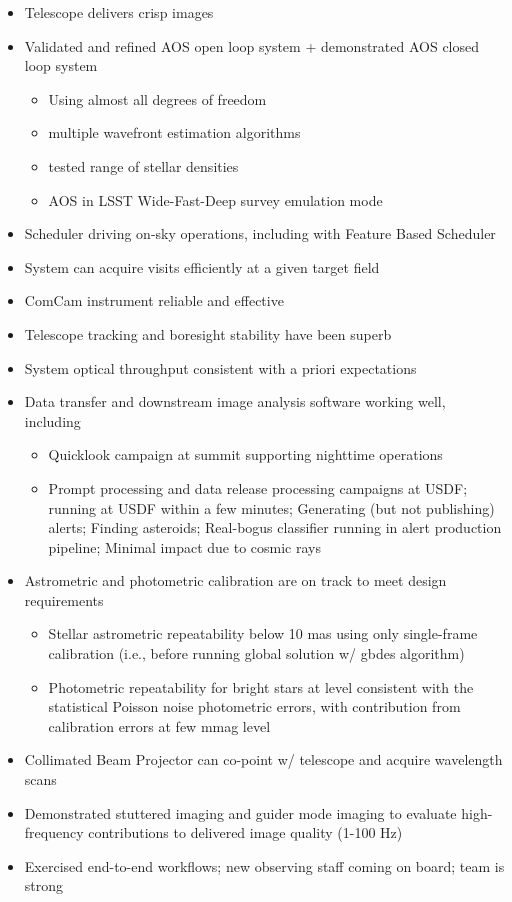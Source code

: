 \begin{itemize}
    \item Telescope delivers crisp images
    \item Validated and refined AOS open loop system + demonstrated AOS closed loop system
    \begin{itemize}
        \item Using almost all degrees of freedom
        \item multiple wavefront estimation algorithms
        \item tested range of stellar densities
        \item AOS in LSST Wide-Fast-Deep survey emulation mode
    \end{itemize}
    \item Scheduler driving on-sky operations, including with Feature Based Scheduler
    \item System can acquire visits efficiently at a given target field
    \item ComCam instrument reliable and effective
    \item Telescope tracking and boresight stability have been superb
    \item System optical throughput consistent with a priori expectations
    \item Data transfer and downstream image analysis software working well, including
    \begin{itemize}
        \item Quicklook campaign at summit supporting nighttime operations
        \item Prompt processing and data release processing campaigns at USDF; running at USDF within a few minutes; Generating (but not publishing) alerts; Finding asteroids; Real-bogus classifier running in alert production pipeline; Minimal impact due to cosmic rays
    \end{itemize}
    \item Astrometric and photometric calibration are on track to meet design requirements
    \begin{itemize}
        \item Stellar astrometric repeatability below 10 mas using only single-frame calibration (i.e., before running global solution w/ gbdes algorithm)
        \item Photometric repeatability for bright stars at level consistent with the statistical Poisson noise photometric errors, with contribution from calibration errors at few mmag level
    \end{itemize}
    \item Collimated Beam Projector can co-point w/ telescope and acquire wavelength scans
    \item Demonstrated stuttered imaging and guider mode imaging to evaluate high-frequency contributions to delivered image quality (1-100 Hz)
    \item Exercised end-to-end workflows; new observing staff coming on board; team is strong
\end{itemize}

